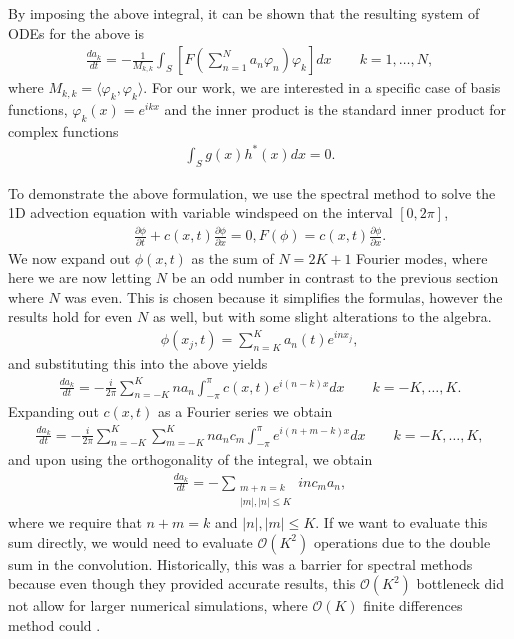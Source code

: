 By imposing the above integral, it can be shown \cite{durran} that the resulting system of ODEs for the above is
\begin{align}
\frac{d a_{k}}{dt} = -\frac{1}{M_{k,k}}\int_{S}\left[F\left(\sum_{n=1}^{N}a_{n}\varphi_{n}\right)\varphi_{k}\right]dx \qquad k=1,\ldots,N,
\end{align}
where $M_{k,k}=\langle \varphi_{k},\varphi_{k}\rangle$. For our work, we are interested in a specific case of basis functions, $\varphi_{k}(x)=e^{ikx}$ and the inner product is the standard inner product for complex functions
\begin{align}
\int_{S}g(x)h^{*}(x)dx=0.
\end{align}

To demonstrate the above formulation, we use the spectral method to solve the 1D advection equation with variable windspeed on the interval $[0,2\pi]$,
\begin{align}
\frac{\partial\phi}{\partial t} + c(x,t)\frac{\partial \phi}{\partial x} =0, F(\phi) = c(x,t)\frac{\partial \phi}{\partial x}.
\end{align}
We now expand out $\phi(x,t)$ as the sum of $N=2K+1$ Fourier modes, where here we are now letting $N$ be an odd number in contrast to the previous section where $N$ was even. This is chosen because it simplifies the formulas, however the results hold for even $N$ as well, but with some slight alterations to the algebra.  
\begin{align}
\phi(x_{j},t)= \sum_{n=K}^{K}a_{n}(t)e^{inx_{j}},
\end{align}
and substituting this into the above yields
\begin{align}
\frac{d a_{k}}{dt} = -\frac{i}{2\pi}\sum_{n=-K}^{K}na_{n}\int_{-\pi}^{\pi}c(x,t)e^{i(n-k)x}dx \qquad k=-K,\ldots,K.
\end{align}
Expanding out $c(x,t)$ as a Fourier series we obtain
\begin{align} 
\frac{d a_{k}}{dt} = -\frac{i}{2\pi}\sum_{n=-K}^{K}\sum_{m=-K}^{K}na_{n}c_{m}\int_{-\pi}^{\pi}e^{i(n+m-k)x}dx \qquad k=-K,\ldots,K,
\end{align}
and upon using the orthogonality of the integral, we obtain
\begin{align}
\frac{da_{k}}{dt} = -\sum_{\substack{m+n=k\\ |m|,|n|\le K}} inc_{m}a_{n},
\end{align}
where we require that $n+m=k$ and $|n|,|m|\le K$. If we want to evaluate this sum directly, we would need to evaluate $\mathcal{O}(K^{2})$ operations due to the double sum in the convolution. Historically, this was a barrier for spectral methods because even though they provided accurate results, this $\mathcal{O}(K^{2})$ bottleneck did not allow for larger numerical simulations, where $\mathcal{O}(K)$ finite differences method could \cite{durran}.

